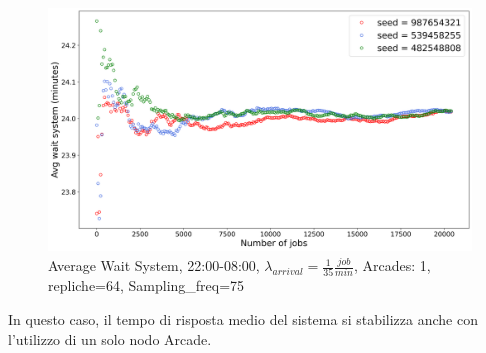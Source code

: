 \documentclass{article}
\begin{document}
\begin{figure}[H]
\centering
\captionsetup{justification=centering,margin=2cm}
\includegraphics[scale=0.48]{images/transient_night_s.png}
\caption{Average Wait System, 22:00-08:00, $\lambda_{arrival}=\frac{1}{35} \frac{job}{min}$, Arcades: 1, repliche=64, Sampling\_freq=75}\label{figura:avg_ws_night_s}
\end{figure}

In questo caso, il tempo di risposta medio del sistema si stabilizza anche con l'utilizzo di un solo nodo Arcade.
\end{document}
